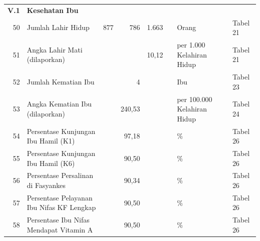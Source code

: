 \begin{small}
\begin{longtable}{rY{12em}rrrrY{5em}Y{5em}}
	         \textbf{V.1} & \textbf{Kesehatan Ibu}                                                                                  &        &        &         &                    &                                &          \\
	                   50 & Jumlah Lahir Hidup                                                                                      &    877 &    786 &   1.663 &                    & Orang                          & Tabel 21 \\
	 51 & Angka Lahir Mati (dilaporkan)                                                                           &        &        &   10,12 &                    & per 1.000 Kelahiran Hidup      & Tabel 21 \\
	                   52 & Jumlah Kematian Ibu                                                                                     &        &      4 &         &                    & Ibu                            & Tabel 23 \\
	 53 & Angka Kematian Ibu (dilaporkan)                                                                         &        & 240,53 &         &                    & per 100.000 Kelahiran Hidup    & Tabel 24 \\
	                   54 & Persentase Kunjungan Ibu Hamil (K1)                                                                     &        &  97,18 &         &                    & \%                             & Tabel 26 \\
	 55 & Persentase Kunjungan Ibu Hamil (K6)                                                                     &        &  90,50 &         &                    & \%                             & Tabel 26 \\
	                   56 & Persentase Persalinan di Fasyankes                                                                      &        &  90,34 &         &                    & \%                             & Tabel 26 \\
	 57 & Persentase Pelayanan Ibu Nifas KF Lengkap                                                               &        &  90,50 &         &                    & \%                             & Tabel 26 \\
	                   58 & Persentase Ibu Nifas Mendapat Vitamin A                                                                 &        &  90,50 &         &                    & \%                             & Tabel 26 \\

\end{longtable}
\end{small}
